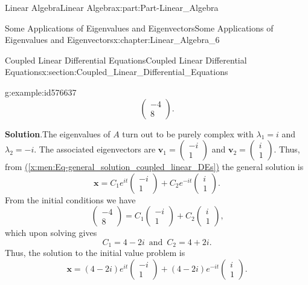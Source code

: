 \documentclass[oneside,10pt,]{book}
\newcommand{\blocktitlefont}{\relax}
\newcommand{\xreffont}{\relax}
\numberwithin{equation}{section}
\newcommand{\bm}[1]{\boldsymbol{#1}}
\begin{document}
\begin{partptx}{Linear Algebra}{}{Linear Algebra}{}{}{x:part:Part-Linear_Algebra}
\begin{chapterptx}{Some Applications of Eigenvalues and Eigenvectors}{}{Some Applications of Eigenvalues and Eigenvectors}{}{}{x:chapter:Linear_Algebra_6}
\begin{sectionptx}{Coupled Linear Differential Equations}{}{Coupled Linear Differential Equations}{}{}{x:section:Coupled_Linear_Differential_Equations}
\begin{example}{}{g:example:id576637}
\begin{equation*}
\begin{pmatrix} -4 \\ 8 \end{pmatrix}\text{.}
\end{equation*}
%
\par\smallskip%
\noindent\textbf{\blocktitlefont Solution}.\hypertarget{g:solution:id576647}{}\quad{}The eigenvalues of \(A\) turn out to be purely complex with \(\lambda_1 = i\) and \(\lambda_2 = -i\). The associated eigenvectors are \(\bm{v}_1 = \begin{pmatrix} -i \\ 1 \end{pmatrix}\) and \(\bm{v}_2 = \begin{pmatrix} i \\ 1 \end{pmatrix}\). Thus, from \hyperref[x:men:Eq-general_solution_coupled_linear_DEs]{({\xreffont\ref{x:men:Eq-general_solution_coupled_linear_DEs}})} the general solution is%
\begin{equation*}
\bm{x} = C_1 e^{it} \begin{pmatrix} -i \\ 1 \end{pmatrix} + C_2 e^{-it} \begin{pmatrix} i \\ 1 \end{pmatrix}\text{.}
\end{equation*}
From the initial conditions we have%
\begin{equation*}
\begin{pmatrix} -4 \\ 8 \end{pmatrix} = C_1 \begin{pmatrix} -i \\ 1 \end{pmatrix} + C_2 \begin{pmatrix} i \\ 1 \end{pmatrix}\text{,}
\end{equation*}
which upon solving gives%
\begin{equation*}
C_1 = 4-2i \, \text{ and } \, C_2 = 4+2i\text{.}
\end{equation*}
Thus, the solution to the initial value problem is%
\begin{equation*}
\bm{x} = (4-2i) e^{it} \begin{pmatrix} -i \\ 1 \end{pmatrix} + (4-2i) e^{-it} \begin{pmatrix} i \\ 1 \end{pmatrix}\text{.}

\end{equation*}
\end{example}
\end{sectionptx}
\end{chapterptx}
\end{partptx}
\end{document}
